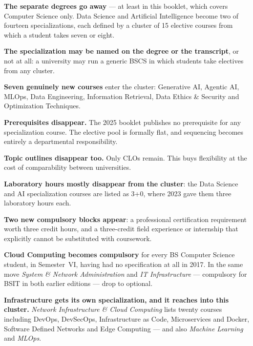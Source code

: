 \documentclass[11pt,a4paper,oneside]{report}
\begin{document}
\begin{tight}
  \item \textbf{The separate degrees go away} --- at least in this booklet, which
        covers Computer Science only. Data Science and Artificial Intelligence
        become two of fourteen specializations, each defined by a cluster of
        15 elective courses from which a student takes seven or eight.
  \item \textbf{The specialization may be named on the degree or the transcript},
        or not at all: a university may run a generic BSCS in which students take
        electives from any cluster.
  \item \textbf{Seven genuinely new courses} enter the cluster: Generative AI,
        Agentic AI, MLOps, Data Engineering, Information Retrieval, Data Ethics \&
        Security and Optimization Techniques.
  \item \textbf{Prerequisites disappear.} The 2025 booklet publishes no
        prerequisite for any specialization course. The elective pool is formally
        flat, and sequencing becomes entirely a departmental responsibility.
  \item \textbf{Topic outlines disappear too.} Only CLOs remain. This buys
        flexibility at the cost of comparability between universities.
  \item \textbf{Laboratory hours mostly disappear from the cluster}: the Data
        Science and AI specialization courses are listed as 3+0, where 2023 gave
        them three laboratory hours each.
  \item \textbf{Two new compulsory blocks appear}: a professional certification
        requirement worth three credit hours, and a three-credit field experience
        or internship that explicitly cannot be substituted with coursework.
  \item \textbf{Cloud Computing becomes compulsory} for every BS Computer Science
        student, in Semester~VI, having had no specification at all in 2017. In
        the same move \emph{System \& Network Administration} and \emph{IT
        Infrastructure} --- compulsory for BSIT in both earlier editions --- drop
        to optional.
  \item \textbf{Infrastructure gets its own specialization, and it reaches into
        this cluster.} \emph{Network Infrastructure \& Cloud Computing} lists
        twenty courses including DevOps, DevSecOps, Infrastructure as Code,
        Microservices and Docker, Software Defined Networks and Edge Computing
        --- and also \emph{Machine Learning} and \emph{MLOps}.
\end{tight}
\end{document}
